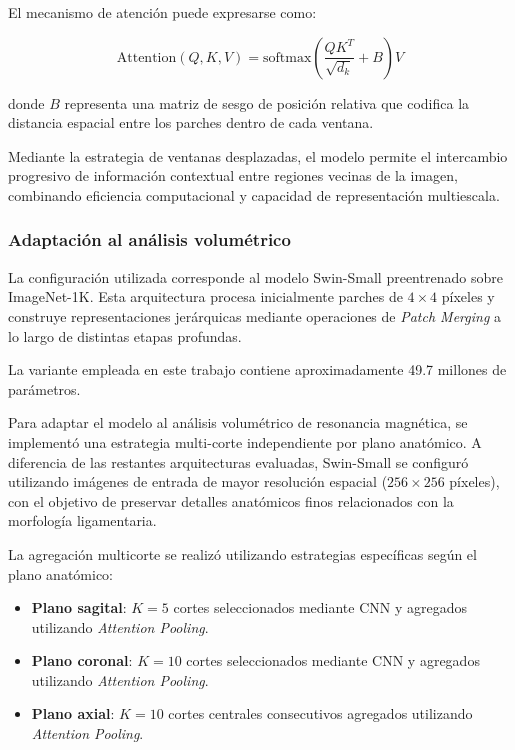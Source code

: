 El mecanismo de atención puede expresarse como:

\begin{equation}
\text{Attention}(Q,K,V) =
\text{softmax}
\left(
\frac{QK^T}{\sqrt{d_k}} + B
\right)V
\end{equation}

donde $B$ representa una matriz de sesgo de posición relativa que codifica la distancia espacial entre los parches dentro de cada ventana.

Mediante la estrategia de ventanas desplazadas, el modelo permite el intercambio progresivo de información contextual entre regiones vecinas de la imagen, combinando eficiencia computacional y capacidad de representación multiescala.

\subsubsection{Adaptación al análisis volumétrico}

La configuración utilizada corresponde al modelo Swin-Small preentrenado sobre ImageNet-1K. Esta arquitectura procesa inicialmente parches de $4 \times 4$ píxeles y construye representaciones jerárquicas mediante operaciones de \textit{Patch Merging} a lo largo de distintas etapas profundas.

La variante empleada en este trabajo contiene aproximadamente 49.7 millones de parámetros.

Para adaptar el modelo al análisis volumétrico de resonancia magnética, se implementó una estrategia multi-corte independiente por plano anatómico. A diferencia de las restantes arquitecturas evaluadas, Swin-Small se configuró utilizando imágenes de entrada de mayor resolución espacial ($256 \times 256$ píxeles), con el objetivo de preservar detalles anatómicos finos relacionados con la morfología ligamentaria.

La agregación multicorte se realizó utilizando estrategias específicas según el plano anatómico:

\begin{itemize}
    \item \textbf{Plano sagital}: $K=5$ cortes seleccionados mediante CNN y agregados utilizando \textit{Attention Pooling}.
    
    \item \textbf{Plano coronal}: $K=10$ cortes seleccionados mediante CNN y agregados utilizando \textit{Attention Pooling}.
    
    \item \textbf{Plano axial}: $K=10$ cortes centrales consecutivos agregados utilizando \textit{Attention Pooling}.
\end{itemize}

